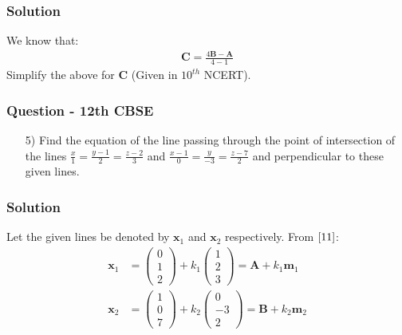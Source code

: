 \documentclass{beamer}
\begin{document}
\begin{frame}
\frametitle{Solution}
We know that:
\begin{align}
\textbf{C} = \frac{4\textbf{B}-\textbf{A}}{4-1}
\end{align}
Simplify the above for \textbf{C} (Given in $10^{th}$ NCERT).
    
\end{frame}









\begin{frame}
\frametitle{Question - 12th CBSE}
\begin{enumerate}
    \item [5)]
Find the equation of the line passing through the point of intersection of the lines $\frac{x}{1} = \frac{y-1}{2} = \frac{z-2}{3}$ and $\frac{x-1}{0} = \frac{y}{-3} = \frac{z-7}{2}$ and perpendicular to these given lines. 
\end{enumerate}
\end{frame}







\begin{frame}
\frametitle{Solution}
Let the given lines be denoted by $\textbf{x}_1$ and $\textbf{x}_2$ respectively. From $\eqref{11}$:
\begin{align}
    \textbf{x}_1 &= \begin{pmatrix}
        0\\
        1\\
        2
    \end{pmatrix} + k_1\begin{pmatrix}
        1\\
        2\\
        3
    \end{pmatrix} = \textbf{A} + k_1\textbf{m}_1 \label{12} \\
    \textbf{x}_2 &= \begin{pmatrix}
        1\\
        0\\
        7
    \end{pmatrix} + k_2\begin{pmatrix}
        0\\
        -3\\
        2
    \end{pmatrix} = \textbf{B} + k_2\textbf{m}_2 \label{13}
\end{align}
\end{frame}
\end{document}
